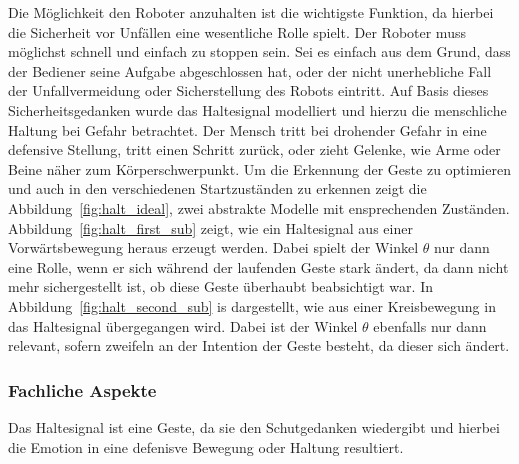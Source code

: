 Die M\"oglichkeit den Roboter anzuhalten ist die wichtigste Funktion, da hierbei die Sicherheit vor Unf\"allen eine wesentliche Rolle spielt. Der Roboter muss m\"oglichst schnell und einfach zu stoppen sein. Sei es einfach aus dem Grund, dass der Bediener seine Aufgabe abgeschlossen hat, oder der nicht unerhebliche Fall der Unfallvermeidung oder Sicherstellung des Robots eintritt.
\newline
Auf Basis dieses Sicherheitsgedanken wurde das Haltesignal modelliert und hierzu die menschliche Haltung bei Gefahr betrachtet. Der Mensch tritt bei drohender Gefahr in eine defensive Stellung, tritt einen Schritt zur\"uck, oder zieht Gelenke, wie Arme oder Beine n\"aher zum K\"orperschwerpunkt.
\newline
Um die Erkennung der Geste zu optimieren und auch in den verschiedenen Startzust\"anden zu erkennen zeigt die Abbildung~\ref{fig:halt_ideal}, zwei abstrakte Modelle mit ensprechenden Zust\"anden. 
\newline
Abbildung~\ref{fig:halt_first_sub} zeigt, wie ein Haltesignal aus einer Vorw\"artsbewegung heraus erzeugt werden. Dabei spielt der Winkel $\theta$ nur dann eine Rolle, wenn er sich w\"ahrend der laufenden Geste stark \"andert, da dann nicht mehr sichergestellt ist, ob diese Geste \"uberhaubt beabsichtigt war.
\newline
In Abbildung~\ref{fig:halt_second_sub} is dargestellt, wie aus einer Kreisbewegung in das Haltesignal \"ubergegangen wird. Dabei ist der Winkel $\theta$ ebenfalls nur dann relevant, sofern zweifeln an der Intention der Geste besteht, da dieser sich \"andert.

\subsubsection{Fachliche Aspekte}
Das Haltesignal ist eine  Geste, da sie den Schutgedanken wiedergibt und hierbei die Emotion in eine defenisve Bewegung oder Haltung resultiert. 

